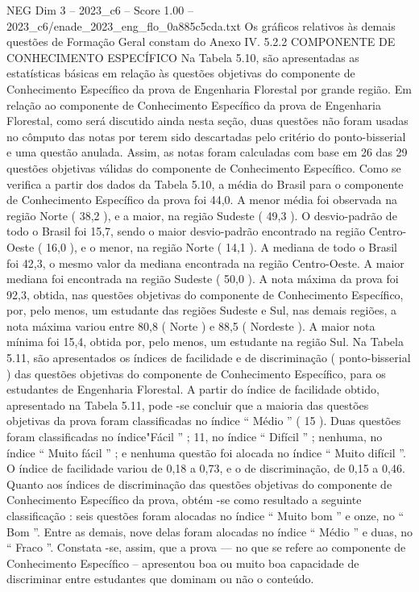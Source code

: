 \begin{textsample}{NEG Dim 3 – 2023\_c6 – Score 1.00 – 2023\_c6/enade\_2023\_eng\_flo\_0a885c5cda.txt}
Os gráficos relativos às demais questões de Formação Geral constam do Anexo IV. 5.2.2 COMPONENTE DE CONHECIMENTO ESPECÍFICO Na Tabela 5.10, são apresentadas as estatísticas básicas em relação às questões objetivas do componente de Conhecimento Específico da prova de Engenharia Florestal por grande região.
Em relação ao componente de Conhecimento Específico da prova de Engenharia Florestal, como será discutido ainda nesta seção, duas questões não foram usadas no cômputo das notas por terem sido descartadas pelo critério do ponto-bisserial e uma questão anulada.
Assim, as notas foram calculadas com base em 26 das 29 questões objetivas válidas do componente de Conhecimento Específico.
Como se verifica a partir dos dados da Tabela 5.10, a média do Brasil para o componente de Conhecimento Específico da prova foi 44,0.
A menor média foi observada na região Norte ( 38,2 ), e a maior, na região Sudeste ( 49,3 ).
O desvio-padrão de todo o Brasil foi 15,7, sendo o maior desvio-padrão encontrado na região Centro-Oeste ( 16,0 ), e o menor, na região Norte ( 14,1 ).
A mediana de todo o Brasil foi 42,3, o mesmo valor da mediana encontrada na região Centro-Oeste.
A maior mediana foi encontrada na região Sudeste ( 50,0 ).
A nota máxima da prova foi 92,3, obtida, nas questões objetivas do componente de Conhecimento Específico, por, pelo menos, um estudante das regiões Sudeste e Sul, nas demais regiões, a nota máxima variou entre 80,8 ( Norte ) e 88,5 ( Nordeste ).
A maior nota mínima foi 15,4, obtida por, pelo menos, um estudante na região Sul.
Na Tabela 5.11, são apresentados os índices de facilidade e de discriminação ( ponto-bisserial ) das questões objetivas do componente de Conhecimento Específico, para os estudantes de Engenharia Florestal.
A partir do índice de facilidade obtido, apresentado na Tabela 5.11, pode -se concluir que a maioria das questões objetivas da prova foram classificadas no índice “ Médio ” ( 15 ).
Duas questões foram classificadas no índice"Fácil ” ; 11, no índice “ Difícil ” ; nenhuma, no índice “ Muito fácil ” ; e nenhuma questão foi alocada no índice “ Muito difícil ”.
O índice de facilidade variou de 0,18 a 0,73, e o de discriminação, de 0,15 a 0,46.
Quanto aos índices de discriminação das questões objetivas do componente de Conhecimento Específico da prova, obtém -se como resultado a seguinte classificação : seis questões foram alocadas no índice “ Muito bom ” e onze, no “ Bom ”.
Entre as demais, nove delas foram alocadas no índice “ Médio ” e duas, no “ Fraco ”.
Constata -se, assim, que a prova — no que se refere ao componente de Conhecimento Específico – apresentou boa ou muito boa capacidade de discriminar entre estudantes que dominam ou não o conteúdo.

\end{textsample}
